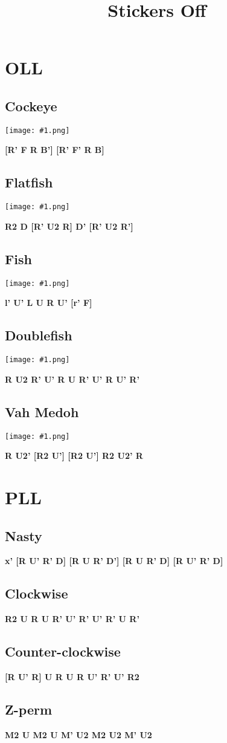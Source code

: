\documentclass[11pt,b5paper]{article}
\newcommand{\named}[1]{\subsection*{#1}}
\newcommand{\alg}[1]{
    \begin{center}
    \Huge \textbf{#1}
    \end{center}
}
\newcommand{\illust}[1]{
    \begin{center}
        \texttt{[image: \#1.png]}
    \end{center}
}
\begin{document}
\title{Stickers Off}
\author{}
\maketitle

\section*{OLL}

\named{Cockeye}
\illust{oll-00-cockeye}
\alg{[R' F R B'] [R' F' R B]}

\named{Flatfish}
\illust{oll-01-flatfish}
\alg{R2 D [R' U2 R] D' [R' U2 R']}

\named{Fish}
\illust{oll-02-fish}
\alg{l' U' L U R U' [r' F]}

\named{Doublefish}
\illust{oll-03-doublefish}
\alg{R U2 R' U' R U R' U' R U' R'}

\named{Vah Medoh}
\illust{oll-05-vah-medoh}
\alg{R U2' [R2 U'] [R2 U'] R2 U2' R}

\newpage{}

\section*{PLL}

\named{Nasty}
\alg{x' [R U' R' D] [R U R' D'] [R U R' D] [R U' R' D]}

\named{Clockwise}
\alg{R2 U R U R' U' R' U' R' U R'}

\named{Counter-clockwise}
\alg{[R U' R] U R U R U' R' U' R2}

\named{Z-perm}
\alg{M2 U M2 U M' U2 M2 U2 M' U2}
\end{document}
